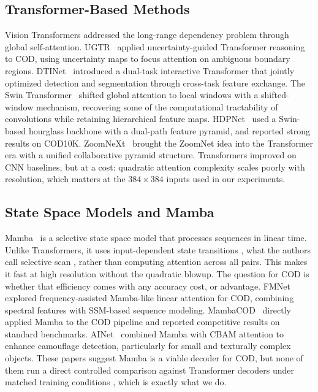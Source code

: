 \documentclass[10pt,conference]{IEEEtran}
\begin{document}
\subsection{Transformer-Based Methods}
Vision Transformers addressed the long-range dependency problem through global self-attention. UGTR~\cite{zhao2021ugtr} applied uncertainty-guided Transformer reasoning to COD, using uncertainty maps to focus attention on ambiguous boundary regions. DTINet~\cite{dtinet2022} introduced a dual-task interactive Transformer that jointly optimized detection and segmentation through cross-task feature exchange. The Swin Transformer~\cite{liu2021swin} shifted global attention to local windows with a shifted-window mechanism, recovering some of the computational tractability of convolutions while retaining hierarchical feature maps. HDPNet~\cite{he2025hdpnet} used a Swin-based hourglass backbone with a dual-path feature pyramid, and reported strong results on COD10K. ZoomNeXt~\cite{zheng2023zoomnext} brought the ZoomNet idea into the Transformer era with a unified collaborative pyramid structure. Transformers improved on CNN baselines, but at a cost: quadratic attention complexity scales poorly with resolution, which matters at the $384{\times}384$ inputs used in our experiments.

\subsection{State Space Models and Mamba}
Mamba~\cite{gu2023mamba} is a selective state space model that processes sequences in linear time. Unlike Transformers, it uses input-dependent state transitions , what the authors call selective scan , rather than computing attention across all pairs. This makes it fast at high resolution without the quadratic blowup. The question for COD is whether that efficiency comes with any accuracy cost, or advantage. FMNet~\cite{fmnet2025} explored frequency-assisted Mamba-like linear attention for COD, combining spectral features with SSM-based sequence modeling. MambaCOD~\cite{mambacod2025} directly applied Mamba to the COD pipeline and reported competitive results on standard benchmarks. AINet~\cite{ainet2026} combined Mamba with CBAM attention to enhance camouflage detection, particularly for small and texturally complex objects. These papers suggest Mamba is a viable decoder for COD, but none of them run a direct controlled comparison against Transformer decoders under matched training conditions , which is exactly what we do.
\end{document}
